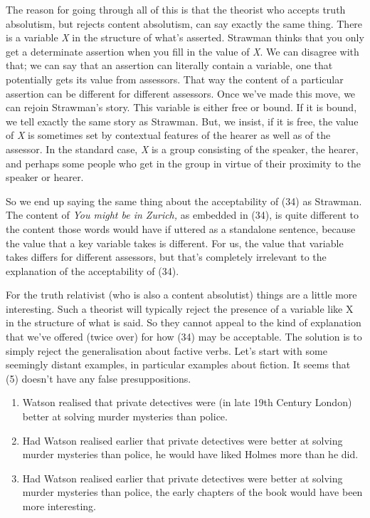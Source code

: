 \documentclass[
  10pt,
  letterpaper,
  DIV=11,
  numbers=noendperiod,
  twoside]{scrartcl}
\providecommand{\tightlist}{%
  \setlength{\itemsep}{0pt}\setlength{\parskip}{0pt}}\usepackage{longtable,booktabs,array}
\begin{document}
The reason for going through all of this is that the theorist who
accepts truth absolutism, but rejects content absolutism, can say
exactly the same thing. There is a variable \emph{X} in the structure of
what's asserted. Strawman thinks that you only get a determinate
assertion when you fill in the value of \emph{X}. We can disagree with
that; we can say that an assertion can literally contain a variable, one
that potentially gets its value from assessors. That way the content of
a particular assertion can be different for different assessors. Once
we've made this move, we can rejoin Strawman's story. This variable is
either free or bound. If it is bound, we tell exactly the same story as
Strawman. But, we insist, if it is free, the value of \emph{X} is
sometimes set by contextual features of the hearer as well as of the
assessor. In the standard case, \emph{X} is a group consisting of the
speaker, the hearer, and perhaps some people who get in the group in
virtue of their proximity to the speaker or hearer.

So we end up saying the same thing about the acceptability of (34) as
Strawman. The content of \emph{You might be in Zurich,} as embedded in
(34), is quite different to the content those words would have if
uttered as a standalone sentence, because the value that a key variable
takes is different. For us, the value that variable takes differs for
different assessors, but that's completely irrelevant to the explanation
of the acceptability of (34).

For the truth relativist (who is also a content absolutist) things are a
little more interesting. Such a theorist will typically reject the
presence of a variable like X in the structure of what is said. So they
cannot appeal to the kind of explanation that we've offered (twice over)
for how (34) may be acceptable. The solution is to simply reject the
generalisation about factive verbs. Let's start with some seemingly
distant examples, in particular examples about fiction. It seems that
(5) doesn't have any false presuppositions.

\begin{enumerate}
\def\labelenumi{\arabic{enumi}.}
\setcounter{enumi}{4}
\tightlist
\item
  Watson realised that private detectives were (in late 19th Century
  London) better at solving murder mysteries than police.
\item
  Had Watson realised earlier that private detectives were better at
  solving murder mysteries than police, he would have liked Holmes more
  than he did.
\item
  Had Watson realised earlier that private detectives were better at
  solving murder mysteries than police, the early chapters of the book
  would have been more interesting.
\end{enumerate}
\end{document}
